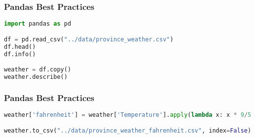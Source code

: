 \documentclass[serif, 9pt, aspectratio=32]{beamer}
\begin{document}
\begin{frame}[fragile]
    \frametitle{Pandas Best Practices}
    \begin{lstlisting}[language=Python]
import pandas as pd

df = pd.read_csv("../data/province_weather.csv")
df.head()
df.info()

weather = df.copy()
weather.describe()
    \end{lstlisting}
\end{frame}

\begin{frame}[fragile]
    \frametitle{Pandas Best Practices}
    \begin{lstlisting}[language=Python]
weather['fahrenheit'] = weather['Temperature'].apply(lambda x: x * 9/5 + 32)

weather.to_csv("../data/province_weather_fahrenheit.csv", index=False)
    \end{lstlisting}
\end{frame}
\end{document}
